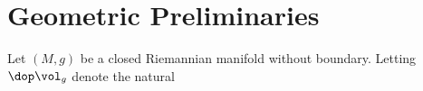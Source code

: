 \section{Geometric Preliminaries}
Let $(M,g)$ be a closed Riemannian manifold without boundary. Letting $\dop \vol_g$ denote the natural 